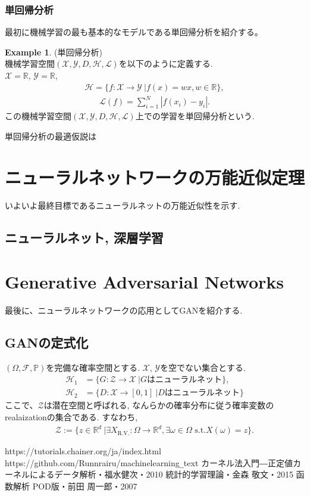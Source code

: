 \documentclass[11pt, a4paper, dvipdfmx]{jsarticle}
\theoremstyle{definition}
\newtheorem{Example+}[Axiom+]{Example}
\newcommand{\Z}{\mathbb{Z}}
\newcommand{\R}{\mathbb{R}}
\newcommand{\X}{\mathcal{X}}
\newcommand{\Y}{\mathcal{Y}}
\renewcommand{\Z}{\mathcal{Z}}
\renewcommand{\L}{\mathcal{L}}
\newcommand{\Hil}{\mathcal{H}}
\newcommand{\MLsp}{(\X, \Y, D, \Hil, \L)}
\newcommand{\Probsp}{(\Omega, \mathcal{F}, \mathbb{P})}
\begin{document}
\subsubsection{単回帰分析}
最初に機械学習の最も基本的なモデルである単回帰分析を紹介する。
\begin{Example+}(単回帰分析)\\
    機械学習空間$\MLsp$を以下のように定義する.\\
    $\X = \R$, $\Y = \R$,
    \begin{align*}
        \Hil = \{f:\X\to\Y~|f(x) = wx, w\in\R\},
    \end{align*}
    \begin{align*}
        \L(f) = \sum_{i = 1}^{N}|f(x_i) - y_i|.
    \end{align*}
    この機械学習空間$\MLsp$上での学習を単回帰分析という.
\end{Example+}
単回帰分析の最適仮説は
\section{ニューラルネットワークの万能近似定理}
いよいよ最終目標であるニューラルネットの万能近似性を示す.\\
\subsection{ニューラルネット, 深層学習}
\section{Generative Adversarial Networks}
最後に、ニューラルネットワークの応用としてGANを紹介する.
\subsection{GANの定式化}
$\Probsp$を完備な確率空間とする.  
$\X$, $\Y$を空でない集合とする. 
\begin{align*}
    \Hil_1 &= \{G:\Z\to\X~| G\text{はニューラルネット}\},\\
    \Hil_{2} &= \{D:\X\to [0, 1]~| D\text{はニューラルネット}\}
\end{align*}
ここで、$\Z$は潜在空間と呼ばれる, なんらかの確率分布に従う確率変数のrealaizationの集合である. 
すなわち, 
\begin{align*}
    \Z := \{z\in\R^d~|\exists X_{\text{R.V.}}:\Omega\to\R^d, \exists\omega\in\Omega\text{ s.t.} X(\omega) = z\}. 
\end{align*}
\begin{thebibliography}{9}
     https://tutorials.chainer.org/ja/index.html
     https://github.com/Runnrairu/machinelearning\verb|_|text
     カーネル法入門―正定値カーネルによるデータ解析・福水健次・2010
     統計的学習理論・金森 敬文・2015
     函数解析 POD版・前田 周一郎・2007
\end{thebibliography}
\end{document}
